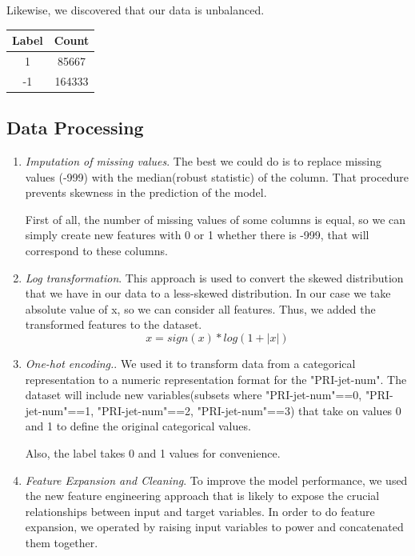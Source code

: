 \documentclass[10pt,conference,compsocconf]{IEEEtran}
\begin{document}
Likewise, we discovered that our data is unbalanced.

\begin{center}
\begin{tabular}{||c c||} 
 \hline
 Label & Count \\ [0.5ex] 
 \hline\hline
 1 & 85667 \\ 
 \hline
 -1 & 164333 \\
 \hline
 \end{tabular}
\end{center}

\subsection{Data Processing}
\begin{enumerate}
\item {\textit{Imputation of missing values}.}
The best we could do is to replace missing values (-999) with the median(robust statistic) of the column. That procedure prevents skewness in the prediction of the model.


First of all, the number of missing values of some columns is equal, so we can simply create new features with 0 or 1 whether there is -999, that will correspond to these columns.

\item {\textit{Log transformation}.}
This approach is used to convert the skewed distribution that we have in our data to a less-skewed distribution. In our case we take absolute value of x, so we can consider all features.
Thus, we added the transformed features to the dataset.
\begin{equation}
    x = sign(x)*log(1+\left| x\right|)
\end{equation}

\item {\textit{One-hot encoding.}.}
We used it to transform data from a categorical representation to a numeric representation format for the "PRI-jet-num". The dataset will include new variables(subsets where "PRI-jet-num"==0, "PRI-jet-num"==1, "PRI-jet-num"==2, "PRI-jet-num"==3) that take on values 0 and 1 to define the original categorical values. 

Also, the label takes 0 and 1 values for convenience.

\item {\textit{Feature Expansion and Cleaning}.}
To improve the model performance, we used the new feature engineering approach that is likely to expose the crucial relationships between input and target variables. In order to do feature expansion, we operated by raising input variables to power and concatenated them together.


\end{enumerate}
\end{document}
